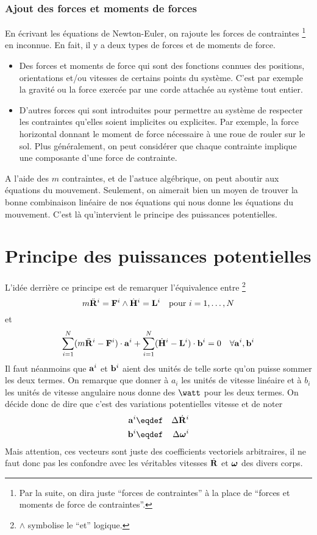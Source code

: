 \subsubsection{Ajout des forces et moments de forces}
En écrivant les équations de Newton-Euler, on rajoute les forces de contraintes
\footnote{Par la suite, on dira juste ``forces de contraintes'' à la place de ``forces et moments de force de contraintes''.}
en inconnue.
En fait, il y a deux types de forces et de moments de force.
\begin{itemize}
	\item Des forces et moments de force qui sont des fonctions connues des positions, orientations et/ou vitesses de certains points du système.
		C'est par exemple la gravité ou la force exercée par une corde attachée au système tout entier.
	\item D'autres forces qui sont introduites pour permettre au système de respecter les contraintes qu'elles soient implicites ou explicites.
		Par exemple, la force horizontal donnant le moment de force nécessaire à une roue de rouler sur le sol.
		Plus généralement, on peut considérer que chaque contrainte implique une composante d'une force de contrainte.
\end{itemize}

A l'aide des $m$ contraintes, et de l'astuce algébrique, on peut aboutir aux équations du mouvement.
Seulement, on aimerait bien un moyen de trouver la bonne combinaison linéaire de nos équations qui nous donne les équations du mouvement.
C'est là qu'intervient le principe des puissances potentielles.

\section{Principe des puissances potentielles}

L'idée derrière ce principe est de remarquer l'équivalence entre
\footnote{$\land$ symbolise le ``et'' logique.}
\[
m\ddot{\bf R}^i = {\bf F}^i \land
\dot{{\bf H}}^i = {\bf L}^i
\quad \text{pour } i = 1, \ldots, N
\]
et
\[
\sum_{i=1}^N (m\ddot{\bf R}^i - {\bf F}^i) \cdot {\bf a}^i +
\sum_{i=1}^N (\dot{{\bf H}}^i - {\bf L}^i) \cdot {\bf b}^i = 0
\quad \forall {\bf a}^i, {\bf b}^i
\]
Il faut néanmoins que ${\bf a}^i$ et ${\bf b}^i$ aient des unités de telle sorte qu'on puisse sommer les deux termes.
On remarque que donner à $a_i$ les unités de vitesse linéaire et à $b_i$ les unités de vitesse angulaire nous donne des $\watt$ pour les deux termes.
On décide donc de dire que c'est des variations potentielles vitesse et de noter
\begin{eqnarray*}
	\fv{a}^i &\eqdef& \Delta \xgd^i\\
	\fv{b}^i &\eqdef& \Delta \omegaf^i
\end{eqnarray*}
Mais attention, ces vecteurs sont juste des coefficients vectoriels arbitraires,
il ne faut donc pas les confondre avec les véritables vitesses $\dot{\bf R}$ et ${\bm \omega}$ des divers corps.

